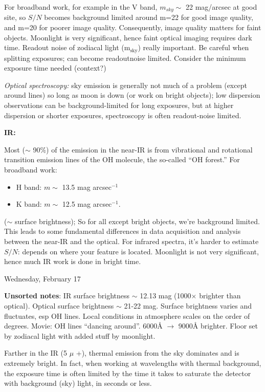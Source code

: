 \documentclass[12pt]{article}
\begin{document}
For broadband work, for example in the V band, $m_{sky}\sim$ 22
mag/arcsec at good site,
so $S/N$ becomes background limited around m=22 for good image quality,
and m=20 for poorer image quality.
Consequently, image quality matters for faint objects.
Moonlight is very significant, hence faint optical imaging requires
dark time.
\textcolor{myBlue}
{Readout noise of zodiacal light (m$_{\textrm{sky}}$) really important.
Be careful when splitting exposures;
can become readoutnoise limited.
Consider the minimum exposure time needed (context?)}

\emph{Optical spectroscopy:} sky emission is generally not much of a problem
(except around lines) so long as moon is down (or work on bright objects);
low dispersion observations can be background-limited for long exposures,
but at higher dispersion or shorter exposures,
spectroscopy is often readout-noise limited.

\textbf{IR:}

Most ($\sim$ 90\%) of the emission in the near-IR is from
vibrational and rotational transition emission lines of the OH molecule,
the so-called ``OH forest.''
For broadband work:
\begin{itemize}
    \item H band: $m\sim$ 13.5 mag arcsec$^{-1}$
    \item K band: $m\sim$ 12.5 mag arcsec$^{-1}$.
\end{itemize}
($\sim$ surface brightness);
So for all except bright objects, we're background limited.
This leads to some
fundamental differences in data acquisition and analysis between the
near-IR and the optical. For infrared spectra, it's harder to estimate
$S/N$: depends on where your feature is located. Moonlight is not very
significant, hence much IR work is done in bright time.

\textcolor{date}{Wednesday, February 17}

\textcolor{myBlue}{\textbf{Unsorted notes}: IR surface brightness
    $\sim$ 12.13 mag (1000$\times$ brighter than optical).
    Optical surface brightness $\sim$ 21-22 mag.
    Surface brightness varies and fluctuates, esp OH lines.
    Local conditions in atmosphere scales on the order of degrees.
    Movie: OH lines ``dancing around''.
    6000\AA{} $\rightarrow$ 9000\AA{} brighter. Floor set by zodiacal
    light with added stuff by moonlight.
}

Farther in the IR (5 $\mu$ +), thermal emission from the sky dominates
and is extremely bright. In fact, when working at wavelengths with thermal
background, the exposure time is often limited by the time it takes to
saturate the detector with background (sky) light, in seconds or less.
\end{document}
